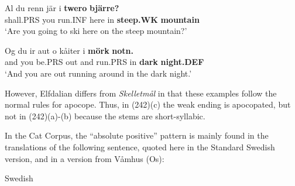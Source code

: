 \item 


 \ea\label{}
\gll Al  du  renn  jär  i  \textbf{twero}\textbf{  bjärre?}\\


shall.PRS  you  run.INF  here  in  \textbf{steep.WK} \textbf{mountain}\\

\glt ‘Are you going to ski here on the steep mountain?’

\z

\item 


 \ea\label{}
\gll Og  du  ir  aut  o  kåiter  i  \textbf{mörk}\textbf{  notn.}\\


and  you  be.PRS  out  and  run.PRS  in  \textbf{dark} \textbf{night.DEF}\\

\glt ‘And you are out running around in the dark night.’

\z

However, Elfdalian differs from \textit{Skelletmål} in that these examples follow the normal rules for apocope. Thus, in (242)(c) the weak ending is apocopated, but not in (242)(a){}-(b) because the stems are short-syllabic.


In the Cat Corpus, the “absolute positive” pattern is mainly found in the translations of the following sentence, quoted here in the Standard Swedish version, and in a version from Våmhus (Os):


\item 

Swedish


